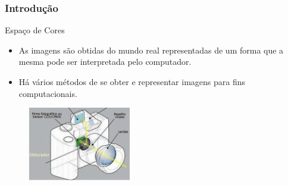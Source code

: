 \documentclass{beamer}
\begin{document}
\begin{frame}
\frametitle{Introdução}

		\begin{block}{Espaço de Cores}
			\begin{itemize}
				\item As imagens são obtidas do mundo real representadas de um forma que a mesma pode ser interpretada pelo computador.
				
				\item Há vários métodos de se obter e representar imagens para fins computacionais.
			\end{itemize} 
		\end{block}
		
		\begin{figure}[!h]
			\begin{center}
				\includegraphics[width=0.4\textwidth]{Figures/cameraDigital}
			\end{center}
		\end{figure}
	
\end{frame}
\end{document}
